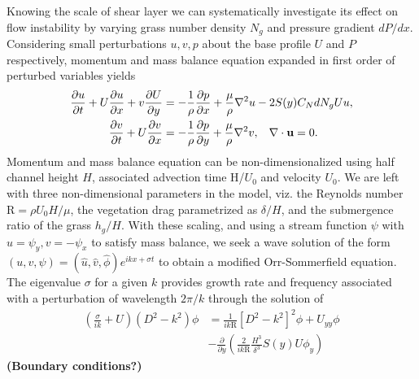 \documentclass[aps,prl,twocolumn,showpacs,superscriptaddress,groupedaddress,10pt]{revtex4-1}  %
\newcommand{\bu}{\mathbf{u}}
\newcommand{\del}{\partial}
\newcommand{\Rey}{\text{R}}
\newcommand{\shreyas}[1]{{\bf (#1)}}
\begin{document}
Knowing the scale of shear layer we can systematically investigate its effect on flow instability by varying grass number density $N_g$ and pressure gradient ${dP}/{dx}$. Considering small perturbations $u, v, p$ about the base profile $U$ and $P$ respectively, momentum and mass balance equation expanded in first order of perturbed variables yields
\begin{equation}
\begin{split}
\frac{\del u}{\del t}+U\frac{\del u}{\del x}+v\frac{\del U}{\del y} &= -\frac{1}{\rho}\frac{\del p}{\del x}+\frac{\mu}{\rho}\nabla^2u-2S(y) C_{N}dN_{g}Uu, \\
\frac{\del v}{\del  t}+ U\frac{\del v}{\del x} &= -\frac{1}{\rho}\frac{\del p}{\del y}+\frac{\mu}{\rho}\nabla^2v, \hspace{0.3cm} \nabla\cdot\bu=0.
\end{split}
\end{equation}
Momentum and mass balance equation can be non-dimensionalized using half channel height $H$, associated advection time H/$U_0$ and velocity $U_0$. 
We are left with three non-dimensional parameters in the model, viz. the Reynolds number $\Rey= {\rho U_0 H}/{\mu}$, the vegetation drag parametrized as $\delta/H$, 
and the submergence ratio of the grass $h_g/H$. With these scaling, and using a stream function $\psi$ with $u = \psi_{y}, v= -\psi_x$ to satisfy mass balance, we seek a wave solution of the form $\left(u,v,\psi \right)= \left(\hat u, \hat v, \hat\phi \right)e^{ikx+\sigma t}$ to  obtain a modified Orr-Sommerfield equation. The eigenvalue $\sigma$ for a given $k$ provides growth rate and frequency associated with a perturbation of wavelength $2\pi/k$ through the solution of
\begin{equation}
\begin{split}
\left(\frac{\sigma}{ik}+U\right) \left(D^2-k^2\right)\phi &= \frac{1}{ik\Rey}\left[D^2 -k^{2} \right]^2\phi +U_{yy}\phi \\
&-\frac{\del}{\del y}\left(\frac{2}{ik\Rey}\frac{H^3}{\delta^3}S(y) U\phi_y\right)
\label{Orr-somerfield}
\end{split}
\end{equation}
\shreyas{Boundary conditions?}
\end{document}
